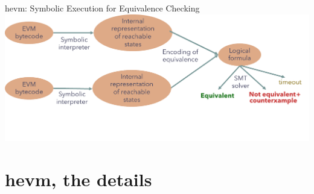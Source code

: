 \documentclass[aspectratio=169]{beamer}
\begin{document}
\begin{frame}{hevm: Symbolic Execution for Equivalence Checking}
\centering
\includegraphics[scale=0.45]{equivalence-pipeline}
\end{frame}
%
%
%
%

\section{hevm, the details}
\end{document}
